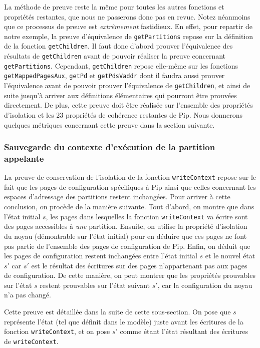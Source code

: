 			La méthode de preuve reste la même pour toutes les autres fonctions et propriétés restantes, que nous ne passerons donc pas en revue. Notez néanmoins que ce processus de preuve est \emph{extrêmement} fastidieux. En effet, pour repartir de notre exemple, la preuve d'équivalence de \texttt{getPartitions} repose sur la définition de la fonction \texttt{getChildren}. Il faut donc d'abord prouver l'équivalence des résultats de \texttt{getChildren} avant de pouvoir réaliser la preuve concernant \texttt{getPartitions}. Cependant, \texttt{getChildren} repose elle-même sur les fonctions \texttt{getMappedPagesAux}, \texttt{getPd} et \texttt{getPdsVaddr} dont il faudra aussi prouver l'équivalence avant de pouvoir prouver l'équivalence de \texttt{getChildren}, et ainsi de suite jusqu'à arriver aux définitions élémentaires qui pourront être prouvées directement. De plus, cette preuve doit être réalisée sur l'ensemble des propriétés d'isolation et les 23 propriétés de cohérence restantes de Pip. Nous donnerons quelques métriques concernant cette preuve dans la section suivante.

			\subsubsection{Sauvegarde du contexte d'exécution de la partition appelante}

			La preuve de conservation de l'isolation de la fonction \texttt{writeContext} repose sur le fait que les pages de configuration spécifiques à Pip ainsi que celles concernant les espaces d'adressage des partitions restent inchangées. Pour arriver à cette conclusion, on procède de la manière suivante. Tout d'abord, on montre que dans l'état initial $s$, les pages dans lesquelles la fonction \texttt{writeContext} va écrire sont des pages accessibles à \emph{une} partition. Ensuite, on utilise la propriété d'isolation du noyau (démontrable sur l'état initial) pour en déduire que ces pages ne font pas partie de l'ensemble des pages de configuration de Pip. Enfin, on déduit que les pages de configuration restent inchangées entre l'état initial $s$ et le nouvel état $s'$ car $s'$ est le résultat des écritures sur des pages n'appartenant pas aux pages de configuration. De cette manière, on peut montrer que les propriétés prouvables sur l'état $s$ restent prouvables sur l'état suivant $s'$, car la configuration du noyau n'a pas changé.

			Cette preuve est détaillée dans la suite de cette sous-section. On pose que $s$ représente l'état (tel que définit dans le modèle) juste avant les écritures de la fonction \texttt{writeContext}, et on pose $s'$ comme étant l'état résultant des écritures de \texttt{writeContext}.


